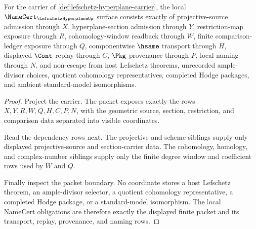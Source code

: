 \begin{theorem}
\label{thm:lefschetz-hyperplane-namecert-obligations}
For the carrier of \autoref{def:lefschetz-hyperplane-carrier}, the local $\NameCert_{\LefschetzHyperplaneUp}$ surface consists exactly of projective-source admission through $X$, hyperplane-section admission through $Y$, restriction-map exposure through $R$, cohomology-window readback through $W$, finite comparison-ledger exposure through $Q$, componentwise $\hsame$ transport through $H$, displayed $\Cont$ replay through $C$, $\Pkg$ provenance through $P$, local naming through $N$, and non-escape from host Lefschetz theorems, unrecorded ample-divisor choices, quotient cohomology representatives, completed Hodge packages, and ambient standard-model isomorphisms.
\end{theorem}
\begin{proof}
Project the carrier. The packet exposes exactly the rows $X,Y,R,W,Q,H,C,P,N$, with the geometric source, section, restriction, and comparison data separated into visible coordinates.

Read the dependency rows next. The projective and scheme siblings supply only displayed projective-source and section-carrier data. The cohomology, homology, and complex-number siblings supply only the finite degree window and coefficient rows used by $W$ and $Q$.

Finally inspect the packet boundary. No coordinate stores a host Lefschetz theorem, an ample-divisor selector, a quotient cohomology representative, a completed Hodge package, or a standard-model isomorphism. The local NameCert obligations are therefore exactly the displayed finite packet and its transport, replay, provenance, and naming rows.
\end{proof}

